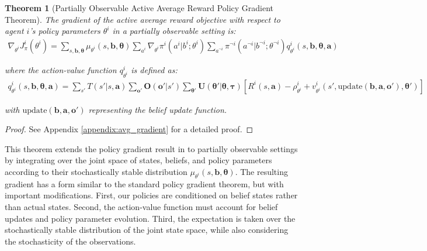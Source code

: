\documentclass[a4paper,12pt]{report}
\newtheorem{theorem}{Theorem}
\begin{document}
\begin{theorem}[Partially Observable Active Average Reward Policy Gradient Theorem]
    \label{thm:avg_gradient}
    The gradient of the active average reward objective with respect to agent $i$'s policy parameters $\theta^i$ in a partially observable setting is:
    \begin{align}
        \nabla_{\theta^i} J^i_\pi(\theta^i) = \sum_{s, \boldsymbol{b}, \boldsymbol{\theta}} \mu_{\theta^i}(s, \boldsymbol{b}, \boldsymbol{\theta}) \sum_{a^i} \nabla_{\theta^i} \pi^i(a^i|b^i; \theta^i) \sum_{a^{\neg i}} \pi^{\neg i}(a^{\neg i}|b^{\neg i}; \theta^{\neg i}) q^i_{\theta^i}(s, \boldsymbol{b}, \boldsymbol{\theta}, \boldsymbol{a})
        \label{eq:avg_gradient}
    \end{align}

    where the action-value function $q^i_{\theta^i}$ is defined as:
    \begin{align}
        q^i_{\theta^i}(s, \boldsymbol{b}, \boldsymbol{\theta}, \boldsymbol{a}) = \sum_{s'} T(s'|s, \boldsymbol{a}) \sum_{\boldsymbol{o}'} \boldsymbol{O}(\boldsymbol{o}'|s') \sum_{\boldsymbol{\theta}'} \boldsymbol{U}(\boldsymbol{\theta}'|\boldsymbol{\theta}, \boldsymbol{\tau}) \left[ R^i(s, \boldsymbol{a}) - \rho^i_{\theta^i} + v^i_{\theta^i}(s', \text{update}(\boldsymbol{b}, \boldsymbol{a}, \boldsymbol{o}'), \boldsymbol{\theta}') \right]
        \label{eq:avg_action_value}
    \end{align}

    with $\text{update}(\boldsymbol{b}, \boldsymbol{a}, \boldsymbol{o}')$ representing the belief update function.

\end{theorem}

\begin{proof}
    See Appendix \ref{appendix:avg_gradient} for a detailed proof.
\end{proof}
This theorem extends the policy gradient result in \citet{kim2022influencing} to partially observable settings by integrating over the joint space of states, beliefs, and policy parameters according to their stochastically stable distribution $\mu_{\theta^i}(s, \boldsymbol{b}, \boldsymbol{\theta})$. The resulting gradient has a form similar to the standard policy gradient theorem, but with important modifications. First, our policies are conditioned on belief states rather than actual states. Second, the action-value function must account for belief updates and policy parameter evolution. Third, the expectation is taken over the stochastically stable distribution of the joint state space, while also considering the stochasticity of the observations.
\end{document}
